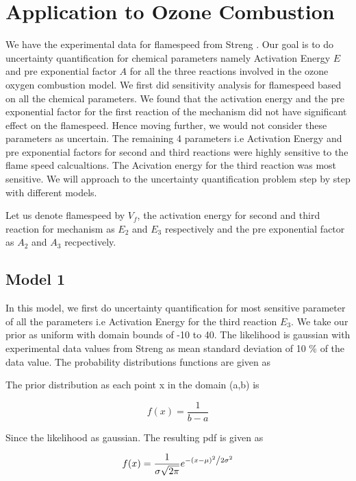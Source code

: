 \section{Application to Ozone Combustion}

\noindent We have the experimental data for flamespeed from Streng \cite{Streng}. Our goal is to do uncertainty quantification for chemical parameters namely Activation Energy $ E $ and pre exponential factor $ A $ for all the three reactions involved in the ozone oxygen combustion model. We first did sensitivity analysis for flamespeed based on all the chemical parameters. We found that the activation energy and the pre exponential factor for the first reaction of the mechanism did not have significant effect on the flamespeed. Hence moving further, we would not consider these parameters as uncertain. The remaining 4 parameters i.e Activation Energy and pre exponential factors for second and third reactions were highly sensitive to the flame speed calcualtions. The Acivation energy for the third reaction was most sensitive. We will approach to the uncertainty quantification problem step by step with different models.  

\noindent Let us denote flamespeed by $V_f$, the activation energy for second and third reaction for mechanism as $E_2$ and $E_3$ respectively and the pre exponential factor as $A_2$ and $A_3$ recpectively. 


\subsection{Model 1}
\noindent In this model, we first do uncertainty quantification for most sensitive parameter of all the parameters i.e Activation Energy for the third reaction $E_3$. We take our prior as uniform with domain bounds of -10 to 40. The likelihood is gaussian with experimental data values from Streng\cite{Streng} as mean standard deviation of 10 \% of the data value. The probability distributions functions are given as

\noindent The prior distribution as each point x in the domain (a,b) is 

$$f(x) = \frac{1}{b -a}$$


\noindent Since the likelihood as gaussian. The resulting pdf is given as 

$$f(x) = \frac{1}{{\sigma \sqrt {2\pi } }}e^{{{ - \left( {x - \mu } \right)^2 } \mathord{\left/ {\vphantom {{ - \left( {x - \mu } \right)^2 } {2\sigma ^2 }}} \right. \kern-\nulldelimiterspace} {2\sigma ^2 }}} $$

